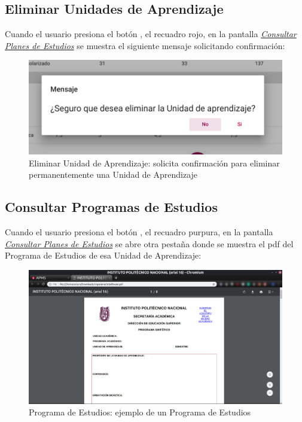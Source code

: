\subsection{Eliminar Unidades de Aprendizaje}
Cuando el usuario presiona el botón , el recuadro rojo, en la pantalla \hyperlink{consultarUA}{\textit{Consultar Planes de Estudios}} se muestra el siguiente mensaje solicitando confirmación:\\
\begin{figure}[H]
    \centering
    \hypertarget{EliminarUA}{\includegraphics[width=0.7\linewidth]{images/GUA/EliminarUA}}
    \caption{Eliminar Unidad de Aprendizaje: solicita confirmación para eliminar permanentemente una Unidad de Aprendizaje}
    \label{EliminarUA}
\end{figure}
\newpage
\subsection{Consultar Programas de Estudios}
Cuando el usuario presiona el botón , el recuadro purpura, en la pantalla \hyperlink{consultarUA}{\textit{Consultar Planes de Estudios}} se abre otra pestaña donde se muestra el pdf del Programa de Estudios de esa Unidad de Aprendizaje:\\
\begin{figure}[H]
    \centering
    \hypertarget{programaUA}{\includegraphics[width=0.7\linewidth]{images/GUA/programaUA}}
    \caption{Programa de Estudios: ejemplo de un Programa de Estudios}
    \label{programaUA}
\end{figure}